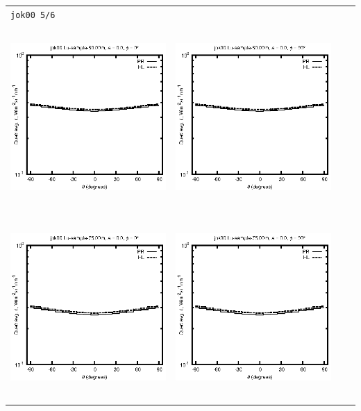 \begin{tabular}{c c c c}
\multicolumn{4}{l}{\texttt{jok00 5/6}} \\
\includegraphics[height=7cm]{../eps/jok00_Lu_sample_50.00m_fwd.eps} &
\includegraphics[height=7cm]{../eps/jok00_Lu_sample_50.00m_cross.eps} \\
\includegraphics[height=7cm]{../eps/jok00_Lu_sample_75.00m_fwd.eps} &
\includegraphics[height=7cm]{../eps/jok00_Lu_sample_75.00m_cross.eps} \\

\end{tabular}
